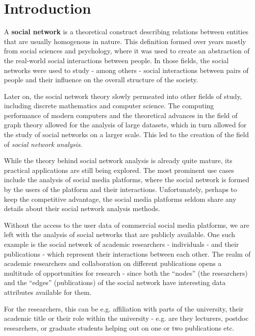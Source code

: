 \chapter*{Introduction}

A \textbf{social network} is a theoretical construct describing relations between entities that are usually homogenous in nature.
This definition formed over years mostly from social sciences and psychology, where it was used to create an abstraction of the real-world social interactions between people.
In those fields, the social networks were used to study - among others - social interactions between pairs of people and their influence on the overall structure of the society.

Later on, the social network theory slowly permeated into other fields of study, including discrete mathematics and computer science.
The computing performance of modern computers and the theoretical advances in the field of graph theory allowed for the analysis of large datasets, which in turn allowed for the study of social networks on a larger scale.
This led to the creation of the field of \textit{social network analysis}.

While the theory behind social network analysis is already quite mature, its practical applications are still being explored.
The most prominent use cases include the analysis of social media platforms, where the social network is formed by the users of the platform and their interactions.
Unfortunately, perhaps to keep the competitive advantage, the social media platforms seldom share any details about their social network analysis methods.

Without the access to the user data of commercial social media platforms, we are left with the analysis of social networks that are publicly available.
One such example is the social network of academic researchers - individuals - and their publications - which represent their interactions between each other.
The realm of academic researchers and collaboration on different publications opens a multitude of opportunities for research - since both the ``nodes'' (the researchers) and the ``edges'' (publications) of the social network have interesting data attributes available for them. 

For the researchers, this can be e.g. affiliation with parts of the university, their academic title or their role within the university - e.g. are they lecturers, postdoc researchers, or graduate students helping out on one or two publications etc.

